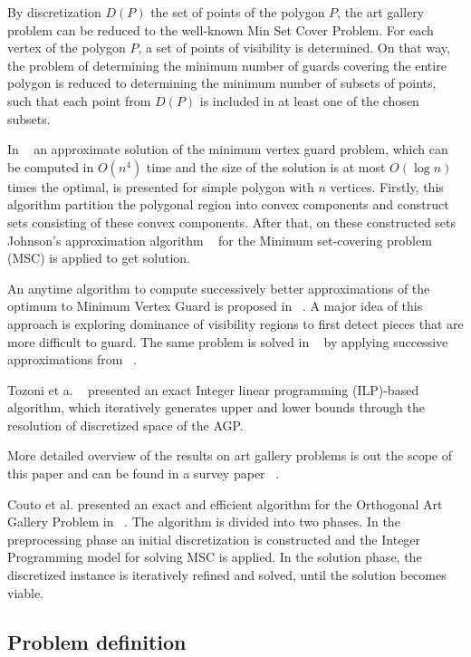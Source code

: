 \documentclass[runningheads,a4paper]{elsarticle}
\begin{document}
     By discretization $D(P)$ the set of points of the polygon $P$, the art gallery problem can be reduced to the well-known Min Set Cover Problem. For each vertex of the polygon $P$, a set of points of visibility is determined. On that way, the problem of determining the minimum number of guards covering the entire polygon is reduced to determining the minimum number of subsets of points, such that each point from $D(P)$ is included in at least one of the chosen subsets.



     In ~\cite{ghosh2010approximation} an approximate solution of the minimum vertex guard problem, which can be computed in $O(n^4)$ time and the size of the solution is at most $O(\log n)$ times the optimal, is presented for simple polygon with $n$ vertices. Firstly, this algorithm partition the polygonal region into convex components and construct sets consisting of these convex components. After that, on these constructed sets Johnson’s approximation algorithm ~\cite{johnson1974approximation} for the Minimum set-covering problem (MSC) is applied to get solution.

     An anytime algorithm to compute successively better approximations of the optimum to Minimum Vertex Guard is proposed in ~\cite{tomas2003approximation}.  A major idea of this approach is exploring dominance of visibility regions to first detect pieces that are
more difficult to guard. The same problem is solved   in ~\cite{tomas2006visibility} by applying successive approximations from  ~\cite{tomas2003approximation}.

Tozoni et a. ~\cite{tozoni2013practical,tozoni2016algorithm}  presented an exact Integer linear programming  (ILP)-based  algorithm, which iteratively generates upper and lower bounds through the resolution of discretized space of the AGP.

More detailed overview of the results on art gallery problems is out the scope of this paper and can be found in a survey paper  ~\cite{ghosh2010approximation2}.


    Couto et al. presented an exact and efficient algorithm for the Orthogonal Art Gallery Problem in ~\cite{couto2007exact}. The algorithm is divided into two phases. In the preprocessing phase an initial discretization is constructed and the Integer Programming model for solving MSC is applied.  In the solution phase, the discretized instance is iteratively refined and solved, until the solution becomes viable.
\subsection{Problem definition}
\end{document}
